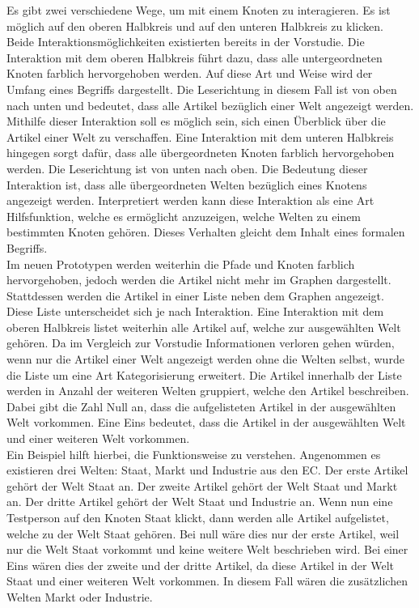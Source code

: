 Es gibt zwei verschiedene Wege, um mit einem Knoten zu interagieren.
Es ist möglich auf den oberen Halbkreis und auf den unteren Halbkreis zu klicken.
Beide Interaktionsmöglichkeiten existierten bereits in der Vorstudie.
Die Interaktion mit dem oberen Halbkreis führt dazu, dass alle untergeordneten Knoten farblich hervorgehoben werden.
Auf diese Art und Weise wird der Umfang eines Begriffs dargestellt.
Die Leserichtung in diesem Fall ist von oben nach unten und bedeutet, dass alle Artikel bezüglich einer Welt angezeigt werden.
Mithilfe dieser Interaktion soll es möglich sein, sich einen Überblick über die Artikel einer Welt zu verschaffen.
Eine Interaktion mit dem unteren Halbkreis hingegen sorgt dafür, dass alle übergeordneten Knoten farblich hervorgehoben werden.
Die Leserichtung ist von unten nach oben.
Die Bedeutung dieser Interaktion ist, dass alle übergeordneten Welten bezüglich eines Knotens angezeigt werden.
Interpretiert werden kann diese Interaktion als eine Art Hilfsfunktion, welche es ermöglicht anzuzeigen, welche Welten zu einem bestimmten Knoten gehören.
Dieses Verhalten gleicht dem Inhalt eines formalen Begriffs.\\

Im neuen Prototypen werden weiterhin die Pfade und Knoten farblich hervorgehoben, jedoch werden die Artikel nicht mehr im Graphen dargestellt.
Stattdessen werden die Artikel in einer Liste neben dem Graphen angezeigt.
Diese Liste unterscheidet sich je nach Interaktion.
Eine Interaktion mit dem oberen Halbkreis listet weiterhin alle Artikel auf, welche zur ausgewählten Welt gehören.
Da im Vergleich zur Vorstudie Informationen verloren gehen würden, wenn nur die Artikel einer Welt angezeigt werden ohne die Welten selbst, wurde die Liste um eine Art Kategorisierung erweitert.
Die Artikel innerhalb der Liste werden in Anzahl der weiteren Welten gruppiert, welche den Artikel beschreiben.
Dabei gibt die Zahl Null an, dass die aufgelisteten Artikel in der ausgewählten Welt vorkommen.
Eine Eins bedeutet, dass die Artikel in der ausgewählten Welt und einer weiteren Welt vorkommen.\\

Ein Beispiel hilft hierbei, die Funktionsweise zu verstehen.
Angenommen es existieren drei Welten: Staat, Markt und Industrie aus den \ac{EC}.
Der erste Artikel gehört der Welt Staat an.
Der zweite Artikel gehört der Welt Staat und Markt an.
Der dritte Artikel gehört der Welt Staat und Industrie an.
Wenn nun eine Testperson auf den Knoten Staat klickt, dann werden alle Artikel aufgelistet, welche zu der Welt Staat gehören.
Bei null wäre dies nur der erste Artikel, weil nur die Welt Staat vorkommt und keine weitere Welt beschrieben wird.
Bei einer Eins wären dies der zweite und der dritte Artikel, da diese Artikel in der Welt Staat und einer weiteren Welt vorkommen.
In diesem Fall wären die zusätzlichen Welten Markt oder Industrie.\\

